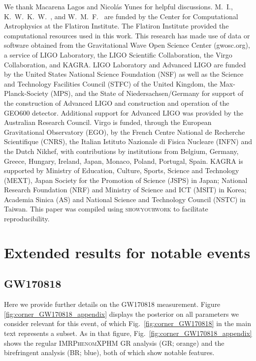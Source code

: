 \documentclass[aps,prd,twocolumn,superscriptaddress,preprintnumbers,nofootinbib]{revtex4-2}
\begin{document}
\begin{acknowledgments}
We thank Macarena Lagos and Nicol\'as Yunes for helpful discussions.
M.~I., K.~W.~K.~W.~, and W.~M.~F.~ are funded by the Center for Computational Astrophysics at the Flatiron Institute.
The Flatiron Institute provided the computational resources used in this work.
This research has made use of data or software obtained from the Gravitational Wave Open Science Center (gwosc.org), a service of LIGO Laboratory, the LIGO Scientific Collaboration, the Virgo Collaboration, and KAGRA.
LIGO Laboratory and Advanced LIGO are funded by the United States National Science Foundation (NSF) as well as the Science and Technology Facilities Council (STFC) of the United Kingdom, the Max-Planck-Society (MPS), and the State of Niedersachsen/Germany for support of the construction of Advanced LIGO and construction and operation of the GEO600 detector.
Additional support for Advanced LIGO was provided by the Australian Research Council.
Virgo is funded, through the European Gravitational Observatory (EGO), by the French Centre National de Recherche Scientifique (CNRS), the Italian Istituto Nazionale di Fisica Nucleare (INFN) and the Dutch Nikhef, with contributions by institutions from Belgium, Germany, Greece, Hungary, Ireland, Japan, Monaco, Poland, Portugal, Spain.
KAGRA is supported by Ministry of Education, Culture, Sports, Science and Technology (MEXT), Japan Society for the Promotion of Science (JSPS) in Japan; National Research Foundation (NRF) and Ministry of Science and ICT (MSIT) in Korea; Academia Sinica (AS) and National Science and Technology Council (NSTC) in Taiwan.
This paper was compiled using \textsc{showyourwork} \cite{Luger2021} to facilitate reproducibility.
\end{acknowledgments}

\appendix

\section{Extended results for notable events}

\subsection{GW170818}
\label{sec:corner_GW170818_appendix}

Here we provide further details on the GW170818 measurement. 
Figure \ref{fig:corner_GW170818_appendix} displays the posterior on all parameters we consider relevant for this event, of which Fig.~\ref{fig:corner_GW170818} in the main text represents a subset.
As in that figure, Fig.~\ref{fig:corner_GW170818_appendix} shows the regular \textsc{IMRPhenomXPHM} \ac{GR} analysis (GR; orange) and the birefringent analysis (BR; blue), both of which show notable features.
\end{document}
